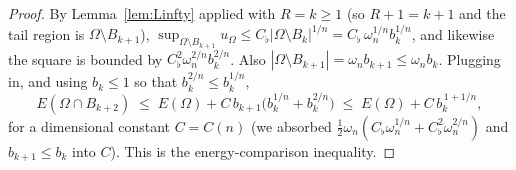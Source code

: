 \documentclass[11pt]{amsart}
\theoremstyle{definition}
\newcommand{\R}{\mathbb R}
\newcommand{\Om}{\Omega}
\newcommand{\abs}[1]{\left|#1\right|}
\begin{document}
\begin{proof}
By Lemma~\ref{lem:Linfty} applied with $R=k\ge1$ (so $R+1=k+1$ and the
tail region is $\Om\setminus B_{k+1}$),
$\sup_{\Om\setminus B_{k+1}}u_\Om\le C_\flat\abs{\Om\setminus B_k}^{1/n}
=C_\flat\,\omega_n^{1/n}b_k^{1/n}$, and likewise the square is bounded by
$C_\flat^2\omega_n^{2/n}b_k^{2/n}$. Also
$\abs{\Om\setminus B_{k+1}}=\omega_n b_{k+1}\le\omega_n b_k$. Plugging in,
and using $b_k\le1$ so that $b_k^{2/n}\le b_k^{1/n}$,
\begin{equation}\label{eq:energy-comp}
   E(\Om\cap B_{k+2})\;\le\;E(\Om)+C\,b_{k+1}\bigl(b_k^{1/n}+b_k^{2/n}\bigr)
   \;\le\;E(\Om)+C\,b_k^{\,1+1/n},
\end{equation}
for a dimensional constant $C=C(n)$ (we absorbed
$\tfrac12\omega_n(C_\flat\omega_n^{1/n}+C_\flat^2\omega_n^{2/n})$ and
$b_{k+1}\le b_k$ into $C$). This is the energy-comparison inequality.


\end{proof}
\end{document}
